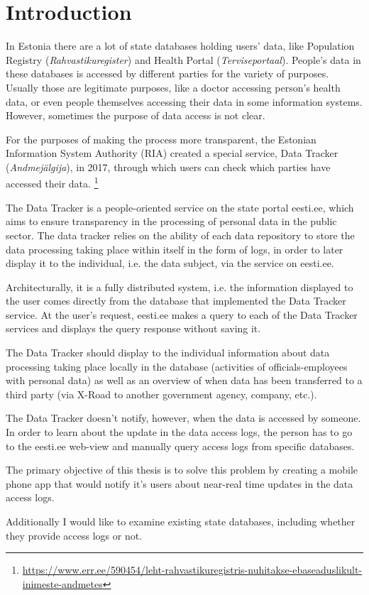 \section{Introduction} \label{Introduction}

In Estonia there are a lot of state databases holding users' data, like Population Registry (\textit{Rahvastikuregister}) and Health Portal (\textit{Terviseportaal}). People's data in these databases is accessed by different parties for the variety of purposes. Usually those are legitimate purposes, like a doctor accessing person's health data, or even people themselves accessing their data in some information systems. However, sometimes the purpose of data access is not clear.

For the purposes of making the process more transparent, the Estonian Information System Authority (RIA) created a special service, Data Tracker (\textit{Andmejälgija}), in 2017, through which users can check which parties have accessed their data. \footnote{\url{https://www.err.ee/590454/leht-rahvastikuregistris-nuhitakse-ebaseaduslikult-inimeste-andmetes}}

The Data Tracker is a people-oriented service on the state portal eesti.ee, which aims to ensure transparency in the processing of personal data in the public sector. The data tracker relies on the ability of each data repository to store the data processing taking place within itself in the form of logs, in order to later display it to the individual, i.e. the data subject, via the service on eesti.ee.\cite{aj-github}

Architecturally, it is a fully distributed system, i.e. the information displayed to the user comes directly from the database that implemented the Data Tracker service. At the user's request, eesti.ee makes a query to each of the Data Tracker services and displays the query response without saving it.\cite{aj-github}

The Data Tracker should display to the individual information about data processing taking place locally in the database (activities of officials-employees with personal data) as well as an overview of when data has been transferred to a third party (via X-Road to another government agency, company, etc.).\cite{aj-github}

The Data Tracker doesn't notify, however, when the data is accessed by someone. In order to learn about the update in the data access logs, the person has to go to the eesti.ee web-view and manually query access logs from specific databases. 

The primary objective of this thesis is to solve this problem by creating a mobile phone app that would notify it's users about near-real time updates in the data access logs. 

Additionally I would like to examine existing state databases, including whether they provide access logs or not.